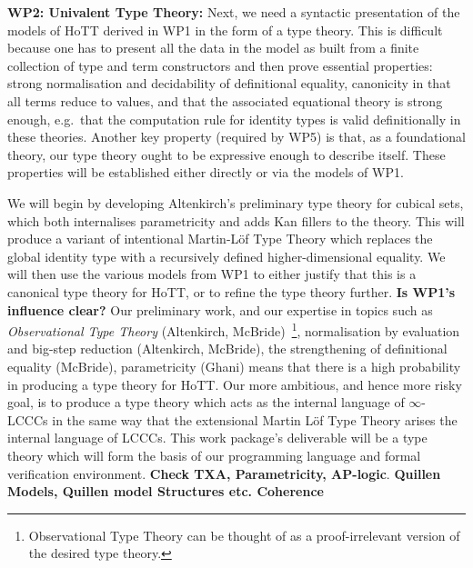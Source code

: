 \documentclass[a4paper,11pt]{article}
\begin{document}
{\bf WP2: Univalent Type Theory:} Next, we need a syntactic
presentation of the models of HoTT derived in WP1 in the form of a
type theory. This is difficult because one has to present all the data
in the model as built from a finite collection of type and term
constructors and then prove essential properties: strong normalisation
and decidability of definitional equality, canonicity in that all
terms reduce to values, and that the associated equational theory is
strong enough, e.g.\ that the computation rule for identity types is
valid definitionally in these theories. Another key property (required
by WP5) is that, as a foundational theory, our type theory ought to be
expressive enough to describe itself. These properties will be established
either directly or via the models of WP1.


We will begin by developing Altenkirch's preliminary type theory for
cubical sets, which both internalises parametricity and adds Kan
fillers to the theory. This will produce a variant of intentional
Martin-L\"of Type Theory which replaces the global identity type with
a recursively defined higher-dimensional equality. We will then use
the various models from WP1 to either justify that this is a canonical
type theory for HoTT, or to refine the type theory further. {\bf Is
  WP1's influence clear?} Our preliminary work, and our expertise in
topics such as {\em Observational Type Theory} (Altenkirch,
McBride)~\footnote{ Observational Type Theory can be thought of as a
  proof-irrelevant version of the desired type theory.},
normalisation by evaluation and big-step reduction (Altenkirch,
McBride), the strengthening of definitional equality (McBride),
parametricity (Ghani) means that there is a high probability in
producing a type theory for HoTT. Our more ambitious, and hence more
risky goal, is to produce a type theory which acts as the internal
language of $\infty$-LCCCs in the same way that the extensional Martin
L\"of Type Theory arises the internal language of LCCCs.  This
work package's deliverable will be a type theory which will form the
basis of our programming language and formal verification
environment. {\bf Check TXA, Parametricity, AP-logic}.  {\bf Quillen
  Models, Quillen model Structures etc. Coherence}

\end{document}
